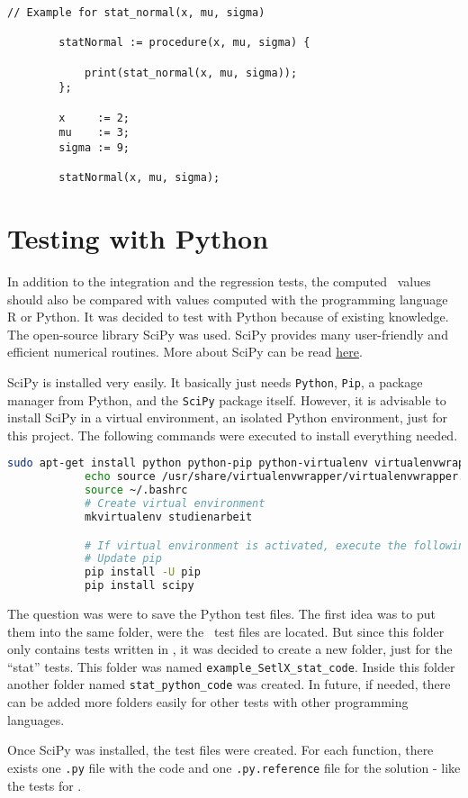 	\begin{center}
		\begin{lstlisting}[caption={Test File Example}, language={setlx}, label={lis:exampleCode}]
		// Example for stat_normal(x, mu, sigma)

		statNormal := procedure(x, mu, sigma) {

			print(stat_normal(x, mu, sigma));
		};

		x     := 2;
		mu	  := 3;
		sigma := 9;

		statNormal(x, mu, sigma);
		\end{lstlisting}
	\end{center}


\section{Testing with Python}

	In addition to the integration and the regression tests, the computed \setlx\ values should also be compared with values computed with the programming language R or Python. It was decided to test with Python because of existing knowledge. The open-source library \ac{SciPy} was used. \ac{SciPy} provides many user-friendly and efficient numerical routines. More about \ac{SciPy} can be read \href{https://www.scipy.org/}{here}.

	\ac{SciPy} is installed very easily. It basically just needs \lstinline{Python}, \lstinline{Pip}, a package manager from Python, and the \lstinline{SciPy} package itself. However, it is advisable to install \ac{SciPy} in a virtual environment, an isolated Python environment, just for this project. The following commands were executed to install everything needed.

	\begin{center}
		\begin{lstlisting}[caption={Install Virtual Environment and SciPy}, language={bash}, label={lis:scipy}]
			sudo apt-get install python python-pip python-virtualenv virtualenvwrapper
			echo source /usr/share/virtualenvwrapper/virtualenvwrapper.sh >> ~/.bashrc
			source ~/.bashrc
			# Create virtual environment
			mkvirtualenv studienarbeit

			# If virtual environment is activated, execute the following:
			# Update pip
			pip install -U pip
			pip install scipy
		\end{lstlisting}
	\end{center}

	The question was were to save the Python test files. The first idea was to put them into the same folder, were the \setlx\ test files are located. But since this folder only contains tests written in \setlx, it was decided to create a new folder, just for the \enquote{stat} tests. This folder was named \lstinline{example_SetlX_stat_code}. Inside this folder another folder named \lstinline{stat_python_code} was created. In future, if needed, there can be added more folders easily for other tests with other programming languages.

	Once \ac{SciPy} was installed, the test files were created. For each function, there exists one \lstinline{.py} file with the code and one \lstinline{.py.reference} file for the solution - like the tests for \setlx.